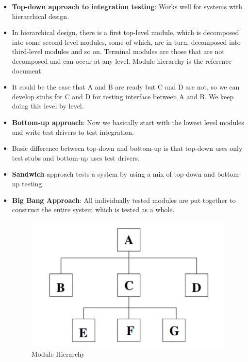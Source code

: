 \documentclass[a4paper]{article}
\begin{document}
\begin{itemize}
    \item \textbf{Top-down approach to integration testing}: Works well for systems with hierarchical design. 
    \item In hierarchical design, there is a first top-level module, which is decomposed into some second-level modules, some of which, are in turn, decomposed into third-level modules and so on. Terminal modules are those that are not decomposed and can occur at any level. Module hierarchy is the reference document.
    \item It could be the case that A and B are ready but C and D are not, so we can develop stubs for C and D for testing interface between A and B. We keep doing this level by level.
    \item \textbf{Bottom-up approach}: Now we basically start with the lowest level modules and write test drivers to test integration.
    \item Basic difference between top-down and bottom-up is that top-down uses only test stubs and bottom-up uses test drivers.
    \item \textbf{Sandwich} approach tests a system by using a mix of top-down and bottom-up testing.
    \item \textbf{Big Bang Approach}: All individually tested modules are put together to construct the entire system which is tested as a whole.
    \begin{figure}[H]
        \centering
        \includegraphics[width=0.3\linewidth]{Degree//static/ST_module_heirarchy.png}
        \caption{Module Hierarchy}
        \label{fig:ST-module-heirarchy}
    \end{figure}
\end{itemize}
\end{document}
